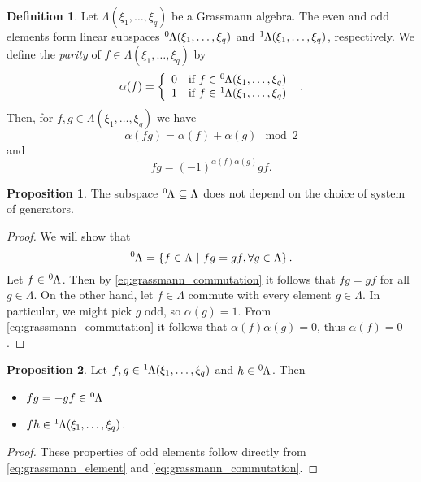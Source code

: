 \documentclass{article}
\theoremstyle{definition}
\newtheorem{definition}{Definition}
\newtheorem{proposition}{Proposition}
\begin{document}
\begin{definition}
    Let $\Lambda(\xi_1, \dots, \xi_q)$ be a Grassmann algebra. The even and odd elements form linear subspaces $\tensor[^0]{\Lambda(\xi_1, \dots, \xi_q)}{}$ and $\tensor[^1]{\Lambda(\xi_1, \dots, \xi_q)}{}$, respectively. We define the \emph{parity} of $f \in \Lambda(\xi_1, \dots, \xi_q)$ by
    \begin{equation*}
        \alpha(f) = \left\{
        \begin{array}{ll}
            0 & \text{if } f \in \tensor[^0]{\Lambda(\xi_1, \dots, \xi_q)}{} \\
            1 & \text{if } f \in \tensor[^1]{\Lambda(\xi_1, \dots, \xi_q)}{}
        \end{array}\right. \ .
    \end{equation*}
    Then, for $f, g \in \Lambda(\xi_1, \dots, \xi_q)$ we have
    \begin{equation*}
        \alpha(fg) = \alpha(f) + \alpha(g) \mod 2
    \end{equation*}
    and
    \begin{equation}
        \label{eq:grassmann_commutation}
        fg = (-1)^{\alpha(f) \alpha(g)}gf.
    \end{equation}

    \begin{proposition}
        The subspace $\tensor[^0]{\Lambda}{} \subseteq \Lambda$ does not depend on the choice of system of generators.
    \end{proposition}
    \begin{proof}
        We will show that
        \begin{equation*}
            \tensor[^0]{\Lambda}{} =
            \left\{ f \in \Lambda \ \middle| \ fg = gf, \forall g \in \Lambda \right\}.
        \end{equation*}
        Let $f \in \tensor[^0]{\Lambda}{}$. Then by \eqref{eq:grassmann_commutation} it follows that $fg = gf$ for all $g \in \Lambda$. On the other hand, let $f \in \Lambda$ commute with every element $g \in \Lambda$. In particular, we might pick $g$ odd, so $\alpha(g) = 1$. From \eqref{eq:grassmann_commutation} it follows that $\alpha(f) \alpha(g) = 0$, thus $\alpha(f) = 0$.
    \end{proof}

    \begin{proposition}
        \label{prop:properties_odd_elements}
        Let $f, g \in \tensor[^1]{\Lambda(\xi_1, \dots, \xi_q)}{}$ and $h \in \tensor[^0]{\Lambda}{}$. Then
        \begin{itemize}
            \item $fg = -gf \in \tensor[^0]{\Lambda}{}$
            \item $fh \in \tensor[^1]{\Lambda(\xi_1, \dots, \xi_q)}{}$.
        \end{itemize}
    \end{proposition}
    \begin{proof}
        These properties of odd elements follow directly from \eqref{eq:grassmann_element} and \eqref{eq:grassmann_commutation}.
    \end{proof}

\end{definition}
\end{document}
